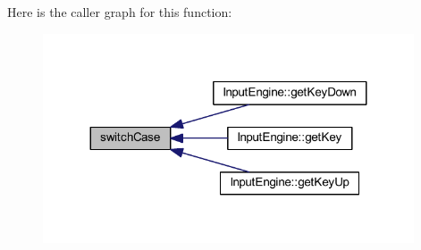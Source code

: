 Here is the caller graph for this function\+:\nopagebreak
\begin{figure}[H]
\begin{center}
\leavevmode
\includegraphics[width=311pt]{d5/df0/_input_engine_8cpp_ab6b1584a4def992d2d2fe7aa1dc61474_icgraph}
\end{center}
\end{figure}


